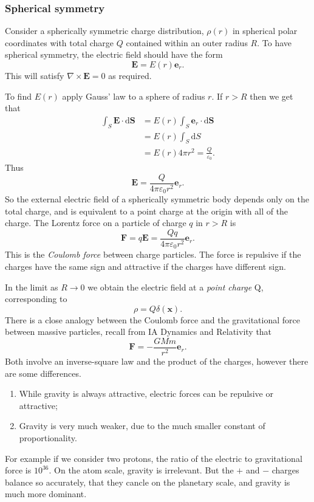 \documentclass{article}
\begin{document}
\subsubsection{Spherical symmetry}
Consider a spherically symmetric charge distribution, $ \rho(r) $ in spherical polar coordinates with total charge $ Q $ contained within an outer radius $ R $. To have spherical symmetry, the electric field should have the form
\[
  \mathbf E = E(r)\mathbf e_r.
\]
This will satisfy $ \nabla\times \mathbf E = 0 $ as required.\par
To find $ E(r) $ apply Gauss' law to a sphere of radius $ r $. If $ r>R $ then we get that
\begin{align*}
	\int_S\mathbf E\cdot \mathrm d\mathbf S &= E(r)\int_S \mathbf e_r\cdot \mathrm d\mathbf S\\
						&= E(r)\int_S\mathrm dS\\
						&= E(r)4\pi r^2=\frac Q{\varepsilon_0}.
\end{align*}
Thus
\[
	\mathbf E = \frac{Q}{4\pi \varepsilon_0 r^2} \mathbf e_r.
\]
So the external electric field of a spherically symmetric body depends only on the total charge, and is equivalent to a point charge at the origin with all of the charge. The Lorentz force on a particle of charge $ q $ in $ r>R $ is 
\[
	\mathbf F = q \mathbf E = \frac{Qq}{4\pi \varepsilon_0r^2}\mathbf e_r.
\]
This is the \textit{Coulomb force} between charge particles. The force is repulsive if the charges have the same sign and attractive if the charges have different sign.\par
In the limit as $ R\to 0 $ we obtain the electric field at a \textit{point charge} Q, corresponding to
\[
  \rho = Q \delta(\mathbf x).
\]
There is a close analogy between the Coulomb force and the gravitational force between massive particles, recall from IA Dynamics and Relativity that
\[
	\mathbf F = -\frac{GMm}{r^2} \mathbf e_r.
\]
Both involve an inverse-square law and the product of the charges, however there are some differences.
\begin{enumerate}
	\item While gravity is always attractive, electric forces can be repulsive or attractive;
	\item Gravity is very much weaker, due to the much smaller constant of proportionality.
\end{enumerate}
For example if we consider two protons, the ratio of the electric to gravitational force is $ 10^{36} $. On the atom scale, gravity is irrelevant. But the $ + $ and $ - $ charges balance so accurately, that they cancle on the planetary scale, and gravity is much more dominant.
\end{document}
